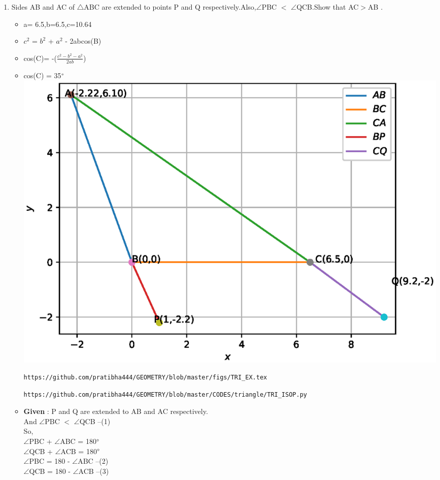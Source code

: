 \documentclass[journal,12pt,twocolumn]{IEEEtran}
\begin{document}
\begin{enumerate}[label=\arabic*]
\item Sides AB and AC of $\triangle$ABC are extended to points P and Q respectively.Also,$\angle$PBC $<$ $\angle$QCB.Show that AC$>$AB .

\begin{itemize}
\item a= 6.5,b=6.5,c=10.64\\
\item $c^2$ = $b^2$ + $a^2$ - 2abcos(B)\\
\item cos(C)= -($\frac{c^2 - b^2 -a^2}{2ab}$)\\
\item cos(C) = 35$\degree$\\
\includegraphics[scale=.4]{./figs/NEWTRI.eps}
\begin{lstlisting}
https://github.com/pratibha444/GEOMETRY/blob/master/figs/TRI_EX.tex
\end{lstlisting}
\begin{lstlisting}
https://github.com/pratibha444/GEOMETRY/blob/master/CODES/triangle/TRI_ISOP.py
\end{lstlisting}
\item \textbf{Given} : P and Q are extended to AB and AC respectively.\\
And $\angle$PBC $<$ $\angle$QCB --(1)\\
So,\\
$\angle$PBC + $\angle$ABC = 180$\degree$  \\
$\angle$QCB + $\angle$ACB = 180$\degree$  \\
$\angle$PBC = 180 - $\angle$ABC --(2)\\
$\angle$QCB = 180 - $\angle$ACB --(3)\\


\end{itemize}
\end{enumerate}
\end{document}
